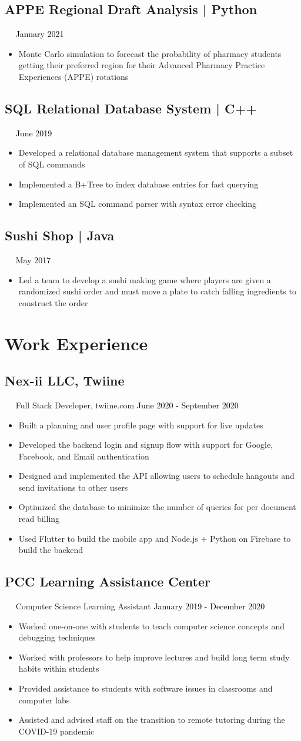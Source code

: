 \documentclass{article}
\newcommand{\resumesection}[3]{
    \subsection*{#1}
    \ 
    \ 
    \small
    \textcolor{csufgrey}{#2}
    \normalsize
    \hfill
    \textcolor{black}{#3}
    \normalsize
}
\begin{document}
\resumesection{APPE Regional Draft Analysis | Python}{}{January 2021}
\begin{itemize}
    \item Monte Carlo simulation to forecast the probability of 
        pharmacy students getting their preferred region for their Advanced Pharmacy Practice Experiences (APPE) rotations
\end{itemize}

\resumesection{SQL Relational Database System | C++}{}{June 2019}
\begin{itemize}
    \item Developed a relational database management system that supports a subset of SQL commands
    \item Implemented a B+Tree to index database entries for fast querying
    \item Implemented an SQL command parser with syntax error checking
\end{itemize}

\resumesection{Sushi Shop | Java}{}{May 2017}
\begin{itemize}
    \item Led a team to develop a sushi making game where players are given a randomized sushi order and must move a plate to catch falling ingredients to construct the order
\end{itemize}
\hfill
\section*{Work Experience}
\resumesection{Nex-ii LLC, Twiine}{Full Stack Developer, twiine.com}{June 2020 - September 2020}
\begin{itemize}
    \item Built a planning and user profile page with support for live updates
    \item Developed the backend login and signup flow with support for Google, Facebook, and Email authentication
    \item Designed and implemented the API allowing users to schedule hangouts and send invitations to other users
    \item Optimized the database to minimize the number of queries for per document read billing
    \item Used Flutter to build the mobile app and Node.js + Python on Firebase to build the backend
\end{itemize}
\resumesection{PCC Learning Assistance Center}{Computer Science Learning Assistant}{January 2019 - December 2020}
\begin{itemize}
    \item Worked one-on-one with students to teach computer science concepts and debugging techniques
    \item Worked with professors to help improve lectures and build long term study habits within students
    \item Provided assistance to students with software issues in classrooms and computer labs
    \item Assisted and advised staff on the transition to remote tutoring during the COVID-19 pandemic
\end{itemize}
\hfill
\end{document}
